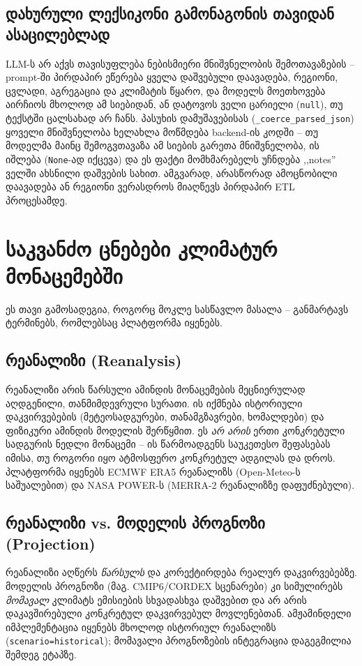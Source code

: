 \documentclass[11pt,a4paper]{article}
\begin{document}
\subsection{დახურული ლექსიკონი გამონაგონის თავიდან ასაცილებლად}
LLM-ს არ აქვს თავისუფლება ნებისმიერი მნიშვნელობის შემოთავაზების --
prompt-ში პირდაპირ ეწერება ყველა დაშვებული დაავადება, რეგიონი, ცვლადი,
აგრეგაცია და კლიმატის წყარო, და მოდელს მოეთხოვება აირჩიოს მხოლოდ ამ
სიებიდან, ან დატოვოს ველი ცარიელი (\texttt{null}), თუ ტექსტში ცალსახად
არ ჩანს. პასუხის დამუშავებისას (\texttt{\_coerce\_parsed\_json})
ყოველი მნიშვნელობა ხელახლა მოწმდება backend-ის კოდში -- თუ მოდელმა
მაინც შემოგვთავაზა ამ სიების გარეთა მნიშვნელობა, ის იშლება
(\texttt{None}-ად იქცევა) და ეს ფაქტი მომხმარებელს უჩნდება
,,notes'' ველში ახსნილი დაშვების სახით. ამგვარად, არასწორად
ამოცნობილი დაავადება ან რეგიონი ვერასდროს მიაღწევს პირდაპირ ETL
პროცესამდე.

\section{საკვანძო ცნებები კლიმატურ მონაცემებში}

ეს თავი გამოსადეგია, როგორც მოკლე სასწავლო მასალა -- განმარტავს
ტერმინებს, რომლებსაც პლატფორმა იყენებს.

\subsection{რეანალიზი (Reanalysis)}
რეანალიზი არის წარსული ამინდის მონაცემების მეცნიერულად აღდგენილი,
თანმიმდევრული სურათი. ის იქმნება ისტორიული დაკვირვებების (მეტეოსადგურები,
თანამგზავრები, ხომალდები) და ფიზიკური ამინდის მოდელის შერწყმით. ეს
\emph{არ არის} ერთი კონკრეტული სადგურის ნედლი მონაცემი -- ის წარმოადგენს
საუკეთესო შეფასებას იმისა, თუ როგორი იყო ატმოსფერო კონკრეტულ ადგილას და
დროს. პლატფორმა იყენებს ECMWF ERA5 რეანალიზს (Open-Meteo-ს საშუალებით)
და NASA POWER-ს (MERRA-2 რეანალიზზე დაფუძნებული).

\subsection{რეანალიზი vs. მოდელის პროგნოზი (Projection)}
რეანალიზი აღწერს \emph{წარსულს} და კორექტირდება რეალურ დაკვირვებებზე.
მოდელის პროგნოზი (მაგ. CMIP6/CORDEX სცენარები) კი სიმულირებს
\emph{მომავალ} კლიმატს ემისიების სხვადასხვა დაშვებით და არ არის
დაკავშირებული კონკრეტულ დაკვირვებულ მოვლენებთან. ამჟამინდელი
იმპლემენტაცია იყენებს მხოლოდ ისტორიულ რეანალიზს (\texttt{scenario=historical});
მომავალი პროგნოზების ინტეგრაცია დაგეგმილია შემდეგ ეტაპზე.
\end{document}
